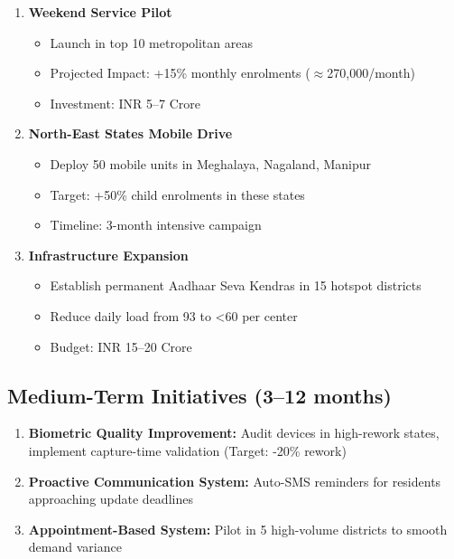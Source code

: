 \documentclass[12pt,a4paper]{article}
\begin{document}
\begin{enumerate}
    \item \textbf{Weekend Service Pilot}
    \begin{itemize}
        \item Launch in top 10 metropolitan areas
        \item Projected Impact: +15\% monthly enrolments ($\approx$270,000/month)
        \item Investment: INR 5--7 Crore
    \end{itemize}
    
    \item \textbf{North-East States Mobile Drive}
    \begin{itemize}
        \item Deploy 50 mobile units in Meghalaya, Nagaland, Manipur
        \item Target: +50\% child enrolments in these states
        \item Timeline: 3-month intensive campaign
    \end{itemize}
    
    \item \textbf{Infrastructure Expansion}
    \begin{itemize}
        \item Establish permanent Aadhaar Seva Kendras in 15 hotspot districts
        \item Reduce daily load from 93 to <60 per center
        \item Budget: INR 15--20 Crore
    \end{itemize}
\end{enumerate}

\subsection{Medium-Term Initiatives (3--12 months)}

\begin{enumerate}
    \item \textbf{Biometric Quality Improvement:} Audit devices in high-rework states, implement capture-time validation (Target: -20\% rework)
    \item \textbf{Proactive Communication System:} Auto-SMS reminders for residents approaching update deadlines
    \item \textbf{Appointment-Based System:} Pilot in 5 high-volume districts to smooth demand variance
\end{enumerate}
\end{document}
